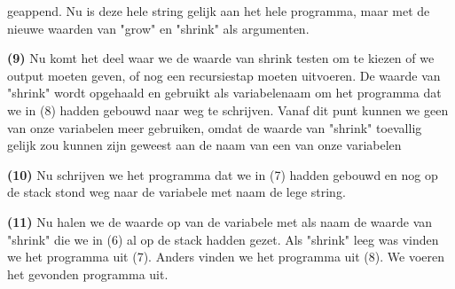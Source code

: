 \begin{description}
geappend. Nu is deze hele string gelijk aan het hele programma, maar met de
nieuwe waarden van "grow" en "shrink" als argumenten.
\item \textbf{(9)} Nu komt het
deel waar we de waarde van shrink testen om te kiezen of we output moeten
geven, of nog een recursiestap moeten uitvoeren. De waarde van "shrink" wordt
opgehaald en gebruikt als variabelenaam om het programma dat we in (8) hadden
gebouwd naar weg te schrijven. Vanaf dit punt kunnen we geen van onze
variabelen meer gebruiken, omdat de waarde van "shrink" toevallig gelijk zou
kunnen zijn geweest aan de naam van een van onze variabelen
\item \textbf{(10)} Nu
schrijven we het programma dat we in (7) hadden gebouwd en nog op de stack
stond weg naar de variabele met naam de lege string.
\item \textbf{(11)} Nu halen we
de waarde op van de variabele met als naam de waarde van "shrink" die we in (6)
al op de stack hadden gezet. Als "shrink" leeg was vinden we het programma uit
(7). Anders vinden we het programma uit (8). We voeren het gevonden programma
uit.
\end{description}
